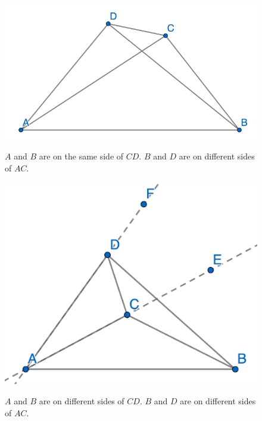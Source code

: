 \begin{figure}[ht]
    \begin{center}
    \includegraphics[width=0.5\linewidth]{figures/proposition_7''.png}
    \label{fig:prop_7''}
    \caption{$A$ and $B$ are on the same side of $CD$. $B$ and $D$ are on different sides of $AC$.}
    \end{center}
\end{figure}

\begin{figure}[ht]
    \begin{center}
    \includegraphics[width=0.5\linewidth]{figures/proposition_7'''.png}
    \label{fig:prop_7'''}
    \caption{$A$ and $B$ are on different sides of $CD$. $B$ and $D$ are on different sides of $AC$.}
    \end{center}
\end{figure}
